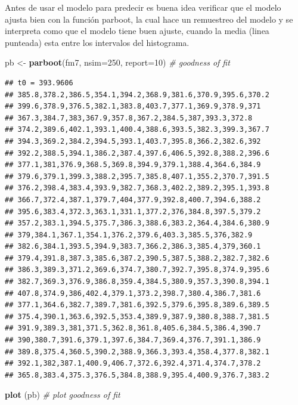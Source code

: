 \documentclass[]{book}
\newenvironment{Shaded}{\begin{snugshade}}{\end{snugshade}}
\newcommand{\KeywordTok}[1]{\textcolor[rgb]{0.13,0.29,0.53}{\textbf{{#1}}}}
\newcommand{\DataTypeTok}[1]{\textcolor[rgb]{0.13,0.29,0.53}{{#1}}}
\newcommand{\DecValTok}[1]{\textcolor[rgb]{0.00,0.00,0.81}{{#1}}}
\newcommand{\StringTok}[1]{\textcolor[rgb]{0.31,0.60,0.02}{{#1}}}
\newcommand{\CommentTok}[1]{\textcolor[rgb]{0.56,0.35,0.01}{\textit{{#1}}}}
\newcommand{\NormalTok}[1]{{#1}}
\begin{document}
Antes de usar el modelo para predecir es buena idea verificar que el
modelo ajusta bien con la función parboot, la cual hace un remuestreo
del modelo y se interpreta como que el modelo tiene buen ajuste, cuando
la media (linea punteada) esta entre los intervalos del histograma.

\begin{Shaded}
\begin{Highlighting}[]
\NormalTok{pb <-}\StringTok{ }\KeywordTok{parboot}\NormalTok{(fm7, }\DataTypeTok{nsim=}\DecValTok{250}\NormalTok{, }\DataTypeTok{report=}\DecValTok{10}\NormalTok{) }\CommentTok{# goodness of fit}
\end{Highlighting}
\end{Shaded}

\begin{verbatim}
## t0 = 393.9606 
## 385.8,378.2,386.5,354.1,394.2,368.9,381.6,370.9,395.6,370.2
## 399.6,378.9,376.5,382.1,383.8,403.7,377.1,369.9,378.9,371
## 367.3,384.7,383,367.9,357.8,367.2,384.5,387,393.3,372.8
## 374.2,389.6,402.1,393.1,400.4,388.6,393.5,382.3,399.3,367.7
## 394.3,369.2,384.2,394.5,393.1,403.7,395.8,366.2,382.6,392
## 392.2,388.5,394.1,386.2,387.4,397.6,406.5,392.8,388.2,396.6
## 377.1,381,376.9,368.5,369.8,394.9,379.1,388.4,364.6,384.9
## 379.6,379.1,399.3,388.2,395.7,385.8,407.1,355.2,370.7,391.5
## 376.2,398.4,383.4,393.9,382.7,368.3,402.2,389.2,395.1,393.8
## 366.7,372.4,387.1,379.7,404,377.9,392.8,400.7,394.6,388.2
## 395.6,383.4,372.3,363.1,331.1,377.2,376,384.8,397.5,379.2
## 357.2,383.1,394.5,375.7,386.3,388.6,383.2,364.4,384.6,380.9
## 379,384.1,367.1,354.1,376.2,379.6,403.3,385.5,376,382.9
## 382.6,384.1,393.5,394.9,383.7,366.2,386.3,385.4,379,360.1
## 379.4,391.8,387.3,385.6,387.2,390.5,387.5,388.2,382.7,382.6
## 386.3,389.3,371.2,369.6,374.7,380.7,392.7,395.8,374.9,395.6
## 382.7,369.3,376.9,386.8,359.4,384.5,380.9,357.3,390.8,394.1
## 407.8,374.9,386,402.4,379.1,373.2,398.7,380.4,386.7,381.6
## 377.1,364.6,382.7,389.7,381.6,392.5,379.6,395.8,389.6,389.5
## 375.4,390.1,363.6,392.5,353.4,389.9,387.9,380.8,388.7,381.5
## 391.9,389.3,381,371.5,362.8,361.8,405.6,384.5,386.4,390.7
## 390,380.7,391.6,379.1,397.6,384.7,369.4,376.7,391.1,386.9
## 389.8,375.4,360.5,390.2,388.9,366.3,393.4,358.4,377.8,382.1
## 392.1,382,387.1,400.9,406.7,372.6,392.4,371.4,374.7,378.2
## 365.8,383.4,375.3,376.5,384.8,388.9,395.4,400.9,376.7,383.2
\end{verbatim}

\begin{Shaded}
\begin{Highlighting}[]
\KeywordTok{plot} \NormalTok{(pb) }\CommentTok{# plot goodness of fit}
\end{Highlighting}
\end{Shaded}
\end{document}
